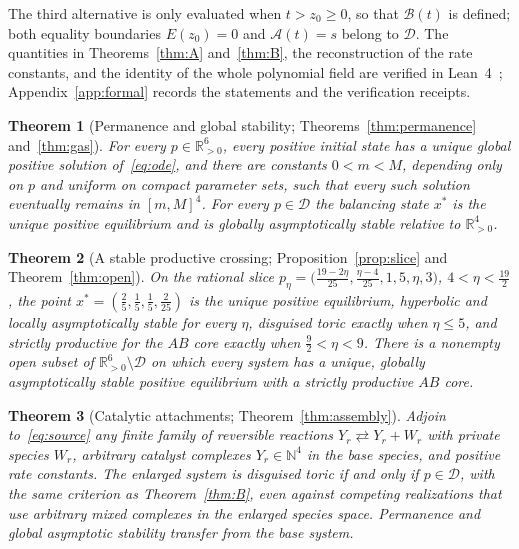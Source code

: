 \documentclass[11pt,a4paper]{article}
\theoremstyle{plain}
\newtheorem{theorem}{Theorem}[section]
\theoremstyle{definition}
\theoremstyle{remark}
\newcommand{\R}{\mathbb{R}}
\newcommand{\N}{\mathbb{N}}
\newcommand{\Rp}{\R_{>0}}
\newcommand{\DT}{\mathcal{D}}
\newcommand{\rA}{\mathcal{A}}
\newcommand{\rB}{\mathcal{B}}
\newcommand{\xs}{x^{*}}
\begin{document}
The third alternative is only evaluated when $t>z_0\ge0$, so that $\rB(t)$ is defined; both equality boundaries $E(z_0)=0$ and $\rA(t)=s$ belong to $\DT$. The quantities in Theorems~\ref{thm:A} and~\ref{thm:B}, the reconstruction of the rate constants, and the identity of the whole polynomial field are verified in Lean~4~\cite{Lean4,Mathlib}; Appendix~\ref{app:formal} records the statements and the verification receipts.

\begin{theorem}[Permanence and global stability; Theorems~\ref{thm:permanence} and~\ref{thm:gas}]\label{thm:C}
For every $p\in\Rp^6$, every positive initial state has a unique global positive solution of~\eqref{eq:ode}, and there are constants $0<m<M$, depending only on $p$ and uniform on compact parameter sets, such that every such solution eventually remains in $[m,M]^4$. For every $p\in\DT$ the balancing state $\xs$ is the unique positive equilibrium and is globally asymptotically stable relative to $\Rp^4$.
\end{theorem}

\begin{theorem}[A stable productive crossing; Proposition~\ref{prop:slice} and Theorem~\ref{thm:open}]\label{thm:D}
On the rational slice $p_\eta=\bigl(\tfrac{19-2\eta}{25},\tfrac{\eta-4}{25},1,5,\eta,3\bigr)$, $4<\eta<\tfrac{19}{2}$, the point $\xs=(\tfrac25,\tfrac15,\tfrac15,\tfrac2{25})$ is the unique positive equilibrium, hyperbolic and locally asymptotically stable for every $\eta$, disguised toric exactly when $\eta\le5$, and strictly productive for the $AB$ core exactly when $\tfrac92<\eta<9$. There is a nonempty open subset of $\Rp^6\setminus\DT$ on which every system has a unique, globally asymptotically stable positive equilibrium with a strictly productive $AB$ core.
\end{theorem}

\begin{theorem}[Catalytic attachments; Theorem~\ref{thm:assembly}]\label{thm:E}
Adjoin to~\eqref{eq:source} any finite family of reversible reactions $Y_r\rightleftarrows Y_r+W_r$ with private species $W_r$, arbitrary catalyst complexes $Y_r\in\N^4$ in the base species, and positive rate constants. The enlarged system is disguised toric if and only if $p\in\DT$, with the same criterion as Theorem~\ref{thm:B}, even against competing realizations that use arbitrary mixed complexes in the enlarged species space. Permanence and global asymptotic stability transfer from the base system.
\end{theorem}
\end{document}
